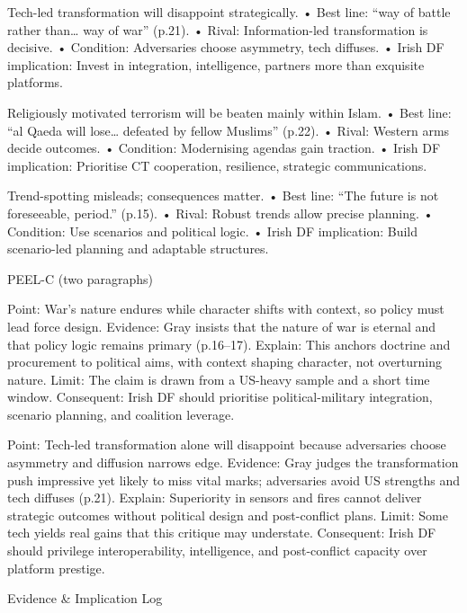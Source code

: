 Tech-led transformation will disappoint strategically.
• Best line: “way of battle rather than… way of war” (p.21).
• Rival: Information-led transformation is decisive.
• Condition: Adversaries choose asymmetry, tech diffuses.
• Irish DF implication: Invest in integration, intelligence, partners more than exquisite platforms.

Religiously motivated terrorism will be beaten mainly within Islam.
• Best line: “al Qaeda will lose… defeated by fellow Muslims” (p.22).
• Rival: Western arms decide outcomes.
• Condition: Modernising agendas gain traction.
• Irish DF implication: Prioritise CT cooperation, resilience, strategic communications.

Trend-spotting misleads; consequences matter.
• Best line: “The future is not foreseeable, period.” (p.15).
• Rival: Robust trends allow precise planning.
• Condition: Use scenarios and political logic.
• Irish DF implication: Build scenario-led planning and adaptable structures.

PEEL-C (two paragraphs)

Point: War’s nature endures while character shifts with context, so policy must lead force design.
Evidence: Gray insists that the nature of war is eternal and that policy logic remains primary (p.16–17).
Explain: This anchors doctrine and procurement to political aims, with context shaping character, not overturning nature.
Limit: The claim is drawn from a US-heavy sample and a short time window.
Consequent: Irish DF should prioritise political-military integration, scenario planning, and coalition leverage.

Point: Tech-led transformation alone will disappoint because adversaries choose asymmetry and diffusion narrows edge.
Evidence: Gray judges the transformation push impressive yet likely to miss vital marks; adversaries avoid US strengths and tech diffuses (p.21).
Explain: Superiority in sensors and fires cannot deliver strategic outcomes without political design and post-conflict plans.
Limit: Some tech yields real gains that this critique may understate.
Consequent: Irish DF should privilege interoperability, intelligence, and post-conflict capacity over platform prestige.

Evidence \& Implication Log


